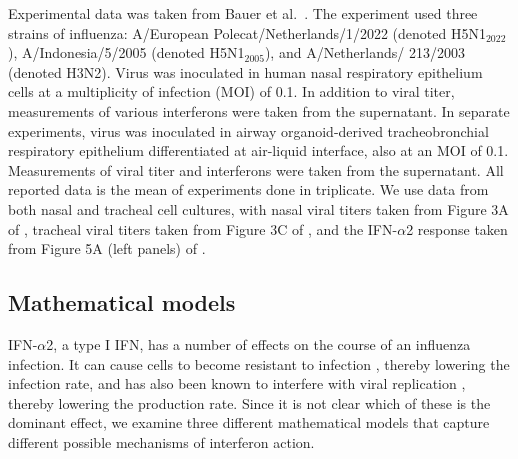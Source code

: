\documentclass[12pt]{article}
\begin{document}
Experimental data was taken from Bauer et al.\ \cite{bauer24}. The experiment used three strains of influenza: A/European Polecat/Netherlands/1/2022 (denoted H5N1$_{2022}$), A/Indonesia/5/2005 (denoted H5N1$_{2005}$), and A/Netherlands/
213/2003 (denoted H3N2). Virus was inoculated in human nasal respiratory epithelium cells at a multiplicity of infection (MOI) of 0.1. In addition to viral titer, measurements of various interferons were taken from the supernatant. In separate experiments, virus was inoculated in airway organoid-derived tracheobronchial respiratory epithelium differentiated at air-liquid interface, also at an MOI of 0.1. Measurements of viral titer and interferons were taken from the supernatant. All reported data is the mean of experiments done in triplicate. We use data from both nasal and tracheal cell cultures, with nasal viral titers taken from Figure 3A of \cite{bauer24}, tracheal viral titers taken from Figure 3C of \cite{bauer24}, and the IFN-$\alpha$2 response taken from Figure 5A (left panels) of \cite{bauer24}.

\subsection{Mathematical models}
IFN-$\alpha$2, a type I IFN, has a number of effects on the course of an influenza infection. It can cause cells to become resistant to infection \cite{arnheiter88}, thereby lowering the infection rate, and has also been known to interfere with viral replication \cite{matzinger11}, thereby lowering the production rate. Since it is not clear which of these is the dominant effect, we examine three different mathematical models that capture different possible mechanisms of interferon action.
\end{document}
